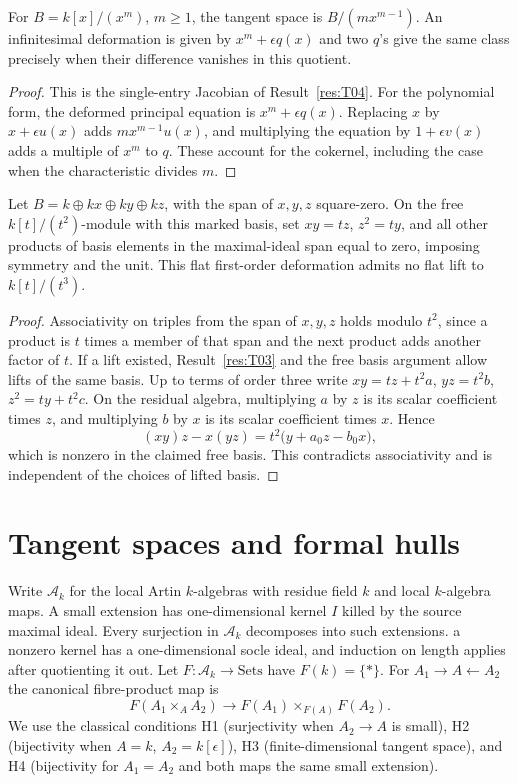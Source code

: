 \begin{example}\label{res:T05}
For \(B=k[x]/(x^m)\), \(m\geq1\), the tangent space is
\(B/(m x^{m-1})\). An infinitesimal deformation is given by
\(x^m+\epsilon q(x)\) and two \(q\)'s give the same class precisely
when their difference vanishes in this quotient.
\end{example}
\begin{proof}
This is the single-entry Jacobian of Result~\ref{res:T04}.
For the polynomial form, the deformed principal equation is
\(x^m+\epsilon q(x)\). Replacing \(x\) by \(x+\epsilon u(x)\)
adds \(m x^{m-1}u(x)\), and multiplying the equation by
\(1+\epsilon v(x)\) adds a multiple of \(x^m\) to \(q\).
These account for the cokernel, including the case when the
characteristic divides \(m\).
\end{proof}

\begin{example}\label{res:T06}
Let \(B=k\oplus kx\oplus ky\oplus kz\), with the span of \(x,y,z\)
square-zero. On the free \(k[t]/(t^2)\)-module with this marked basis,
set \(xy=tz\), \(z^2=ty\), and all other products of basis elements
in the maximal-ideal span equal to zero, imposing symmetry and the unit.
This flat first-order deformation admits no flat lift to \(k[t]/(t^3)\).
\end{example}
\begin{proof}
Associativity on triples from the span of \(x,y,z\) holds modulo
\(t^2\), since a product is \(t\) times a member of that span
and the next product adds another factor of \(t\).
If a lift existed, Result~\ref{res:T03} and the free basis argument
allow lifts of the same basis. Up to terms of order three write
\(xy=tz+t^2a\), \(yz=t^2b\), \(z^2=ty+t^2c\).
On the residual algebra, multiplying \(a\) by \(z\) is its
scalar coefficient times \(z\), and multiplying \(b\) by \(x\)
is its scalar coefficient times \(x\). Hence
\[
 (xy)z-x(yz)=t^2\bigl(y+a_0z-b_0x\bigr),
\]
which is nonzero in the claimed free basis. This contradicts
associativity and is independent of the choices of lifted basis.
\end{proof}

\section{Tangent spaces and formal hulls}

Write \(\mathcal A_k\) for the local Artin \(k\)-algebras with residue
field \(k\) and local \(k\)-algebra maps. A small extension has
one-dimensional kernel \(I\) killed by the source maximal ideal.
Every surjection in \(\mathcal A_k\) decomposes into such extensions.
a nonzero kernel has a one-dimensional socle ideal, and induction on
length applies after quotienting it out. Let \(F:\mathcal A_k\to
\mathrm{Sets}\) have \(F(k)=\{*\}\). For \(A_1\to A\leftarrow A_2\)
the canonical fibre-product map is
\[
 F(A_1\times_A A_2)\longrightarrow F(A_1)\times_{F(A)}F(A_2).
\]
We use the classical conditions H1 (surjectivity when \(A_2\to A\)
is small), H2 (bijectivity when \(A=k\), \(A_2=k[\epsilon]\)),
H3 (finite-dimensional tangent space), and H4 (bijectivity for
\(A_1=A_2\) and both maps the same small extension).

